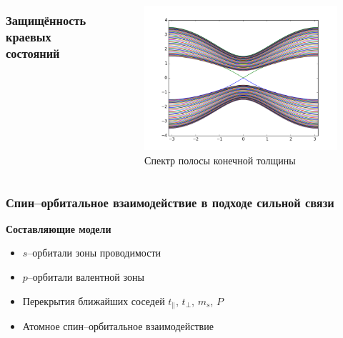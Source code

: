 \documentclass{beamer}
\begin{document}
\begin{frame}
    \begin{columns}
        \frametitle{Защищённость краевых состояний}
        \begin{column}{0.5\textwidth}
        \end{column}
        \begin{column}{0.5\textwidth}
            \begin{figure}
                \includegraphics[width=\linewidth]{eff_ham_stripe.png}
                \caption{Спектр полосы конечной толщины}
            \end{figure}
        \end{column}
    \end{columns}
\end{frame}

\begin{frame}
    \frametitle{Спин--орбитальное взаимодействие в подходе сильной связи}
    \textbf{\large Составляющие модели}
    \begin{itemize}
        \item $s$--орбитали зоны проводимости
        \item $p$--орбитали валентной зоны
        \item Перекрытия ближайших соседей $t_\parallel$, $t_\perp$, $m_s$, $P$
        \item Атомное спин--орбитальное взаимодействие
    \end{itemize}
\end{frame}
\end{document}
